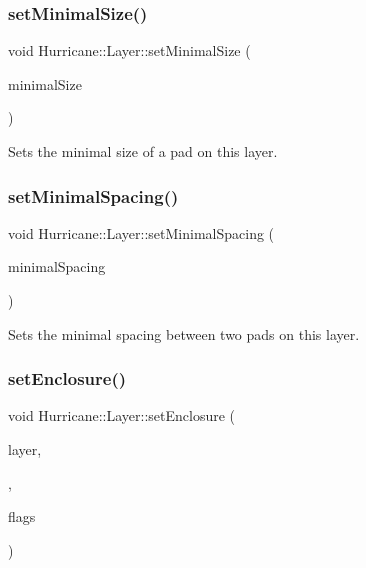 \subsubsection{\texorpdfstring{set\+Minimal\+Size()}{setMinimalSize()}}
{\footnotesize\ttfamily void Hurricane\+::\+Layer\+::set\+Minimal\+Size (\begin{DoxyParamCaption}\item[{const \hyperlink{group__DbUGroup_ga4fbfa3e8c89347af76c9628ea06c4146}{Db\+U\+::\+Unit} \&}]{minimal\+Size }\end{DoxyParamCaption})}

Sets the minimal size of a pad on this layer. \mbox{\label{classHurricane_1_1Layer_a81a8a24526e8535fba5a35cdcc194a8f}} 
\subsubsection{\texorpdfstring{set\+Minimal\+Spacing()}{setMinimalSpacing()}}
{\footnotesize\ttfamily void Hurricane\+::\+Layer\+::set\+Minimal\+Spacing (\begin{DoxyParamCaption}\item[{const \hyperlink{group__DbUGroup_ga4fbfa3e8c89347af76c9628ea06c4146}{Db\+U\+::\+Unit} \&}]{minimal\+Spacing }\end{DoxyParamCaption})}

Sets the minimal spacing between two pads on this layer. \mbox{\label{classHurricane_1_1Layer_a04e9c983525d074508d7e10107c1c3c7}} 
\subsubsection{\texorpdfstring{set\+Enclosure()}{setEnclosure()}}
{\footnotesize\ttfamily void Hurricane\+::\+Layer\+::set\+Enclosure (\begin{DoxyParamCaption}\item[{const \hyperlink{classHurricane_1_1BasicLayer}{Basic\+Layer} $\ast$}]{layer,  }\item[{\hyperlink{group__DbUGroup_ga4fbfa3e8c89347af76c9628ea06c4146}{Db\+U\+::\+Unit}}]{,  }\item[{uint32\+\_\+t}]{flags }\end{DoxyParamCaption})\hspace{0.3cm}{\ttfamily [virtual]}}


